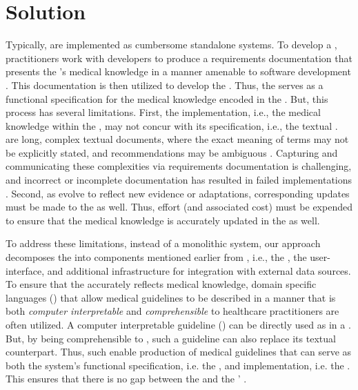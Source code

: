 \section{Solution}

Typically, \CDSSs{} are implemented as cumbersome standalone systems.
To develop a \CDSS{}, practitioners work with
developers to produce a requirements documentation
that presents the \BPGs{}'s medical knowledge in a manner amenable to software development \cite{PelegJBI13}.
This documentation is then utilized to develop the \CDSS{}.
Thus, the \BPG{}
serves as a functional specification for the medical knowledge encoded in the
\CDSS{}.
But, this process has several limitations.
First, the implementation, i.e., the medical knowledge within the \CDSS{},
may not concur with its specification, i.e., the textual \BPG{}.
\BPGs{} are long, complex textual documents,
where the exact meaning of terms may not be explicitly stated, and recommendations may be ambiguous \cite{ClerqAIM03}.
Capturing and communicating these complexities via requirements documentation
is challenging, and incorrect or incomplete documentation has resulted in failed
implementations \cite{KubbenBook19}. Second, as \BPGs{} evolve to reflect
new evidence or adaptations, corresponding updates must be made to the
\CDSS{} as well. Thus, effort (and associated cost) must be
expended to ensure that the medical knowledge
is accurately updated in the \CDSS{} as well.

To address these limitations, instead of a monolithic system, our approach
decomposes the \CDSSs{} into components mentioned earlier from
\cite{SuttonNature20}, i.e., the \BPGLogic{}, the user-interface, and additional
infrastructure for integration with external data sources.
To ensure that the \BPGLogic{} accurately reflects medical knowledge,
domain specific languages (\DSL{}) that allow medical guidelines to
be described in a manner that is both \emph{computer interpretable} and
\emph{comprehensible} to healthcare practitioners are often utilized.
A computer interpretable guideline (\CIG{}) can be directly used as
\BPGLogic{} in a \CDSS{}. But, by being comprehensible to \HCPs{},
such a guideline can also replace its textual counterpart.
Thus, such \DSLs{} enable production of medical guidelines that can serve
as both the system's functional specification, i.e. the \BPG{}, and implementation, i.e. the
\BPGLogic{}. This ensures that there is no gap between the \BPG{} and the
\CDSS{}' \BPGLogic{}.


